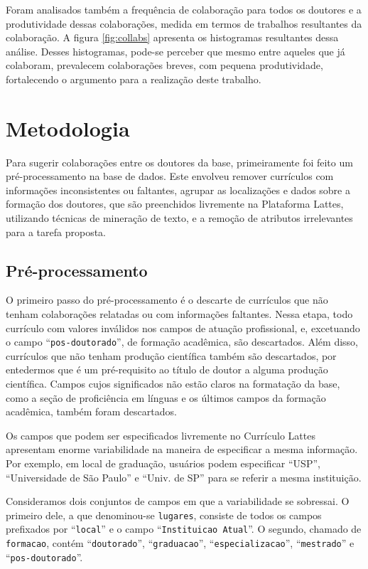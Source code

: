 \documentclass[12pt]{article}
\begin{document}
Foram analisados também a frequência de colaboração para todos os doutores e a produtividade dessas colaborações, medida em termos de trabalhos resultantes da colaboração.
A figura \ref{fig:collabs} apresenta os histogramas resultantes dessa análise.
Desses histogramas, pode-se perceber que mesmo entre aqueles que já colaboram, prevalecem colaborações breves, com pequena produtividade, fortalecendo o argumento para a realização deste trabalho.

\section{Metodologia}
\label{sec:methods}

Para sugerir colaborações entre os doutores da base, primeiramente foi feito um pré-processamento na base de dados.
Este envolveu remover currículos com informações inconsistentes ou faltantes, agrupar as localizações e dados sobre a formação dos doutores, que são preenchidos livremente na Plataforma Lattes, utilizando técnicas de mineração de texto, e a remoção de atributos irrelevantes para a tarefa proposta.

\subsection{Pré-processamento}
\label{sec:preprocess}

O primeiro passo do pré-processamento é o descarte de currículos que não tenham colaborações relatadas ou com informações faltantes.
Nessa etapa, todo currículo com valores inválidos nos campos de atuação profissional, e, excetuando o campo ``\texttt{pos-doutorado}'', de formação acadêmica, são descartados.
Além disso, currículos que não tenham produção científica também são descartados, por entedermos que é um pré-requisito ao título de doutor a alguma produção científica.
Campos cujos significados não estão claros na formatação da base, como a seção de proficiência em línguas e os últimos campos da formação acadêmica, também foram descartados.

Os campos que podem ser especificados livremente no Currículo Lattes apresentam enorme variabilidade na maneira de especificar a mesma informação.
Por exemplo, em local de graduação, usuários podem especificar ``USP'', ``Universidade de São Paulo'' e ``Univ. de SP'' para se referir a mesma instituição.

Consideramos dois conjuntos de campos em que a variabilidade se sobressai.
O primeiro dele, a que denominou-se \texttt{lugares}, consiste de todos os campos prefixados por ``\texttt{local}'' e o campo ``\texttt{Instituicao Atual}''.
O segundo, chamado de \texttt{formacao}, contém ``\texttt{doutorado}'', ``\texttt{graduacao}'', ``\texttt{especializacao}'', ``\texttt{mestrado}'' e ``\texttt{pos-doutorado}''.
\end{document}
